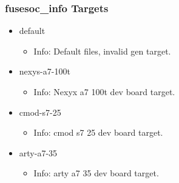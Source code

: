 \subsubsection{fusesoc\_info Targets}
\begin{itemize}
\item default
	\begin{itemize}
	\item[$\space$] Info: Default files, invalid gen target.
	\end{itemize}
\item nexys-a7-100t
	\begin{itemize}
	\item[$\space$] Info: Nexyx a7 100t dev board target.
	\end{itemize}
\item cmod-s7-25
	\begin{itemize}
	\item[$\space$] Info: cmod s7 25 dev board target.
	\end{itemize}
\item arty-a7-35
	\begin{itemize}
	\item[$\space$] Info: arty a7 35 dev board target.
	\end{itemize}
\end{itemize}
